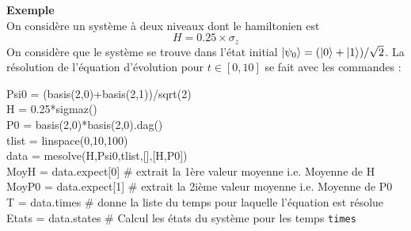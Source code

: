 \textbf{Exemple}\\
On considère un système à deux niveaux dont le hamiltonien est
\begin{equation}
H = 0.25\times\sigma_z
\end{equation}
On considère que le système se trouve dans l'état initial $\vert\psi_0\rangle=(\vert0\rangle+\vert1\rangle)/\sqrt{2}$. La résolution de l'équation d'évolution pour $t\in[0,10]$ se fait avec les commandes :\\
\begin{tt}
Psi0 = (basis(2,0)+basis(2,1))/sqrt(2)\\
H = 0.25*sigmaz()\\
P0 = basis(2,0)*basis(2,0).dag()\\
tlist = linspace(0,10,100)\\
data = mesolve(H,Psi0,tlist,[],[H,P0])\\
MoyH = data.expect[0] \# extrait la 1ère valeur moyenne i.e. Moyenne de H\\
MoyP0 = data.expect[1] \# extrait la 2ième valeur moyenne i.e. Moyenne de P0\\
T = data.times \# donne la liste du temps pour laquelle l'équation est résolue\\
Etats = data.states \# Calcul les états du système pour les temps \texttt{times}\\
\end{tt}
